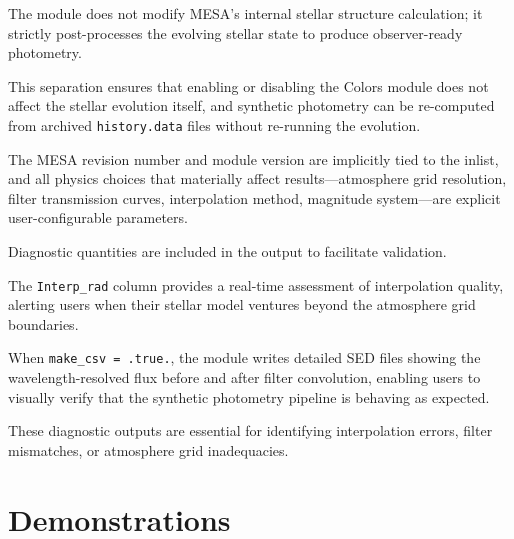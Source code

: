 \documentclass[linenumbers,apj,twocolumn, floatfix]{aastex701} \usepackage{amsmath} \usepackage{longtable} \usepackage{graphicx} \usepackage{ulem} \usepackage{xcolor} \usepackage{lettrine} \usepackage{yfonts} \usepackage{rotating}
\begin{document}
The module does not modify MESA's internal stellar structure calculation; it strictly post-processes the evolving stellar state to produce observer-ready photometry.

This separation ensures that enabling or disabling the Colors module does not affect the stellar evolution itself, and synthetic photometry can be re-computed from archived \texttt{history.data} files without re-running the evolution.

The MESA revision number and module version are implicitly tied to the inlist, and all physics choices that materially affect results—atmosphere grid resolution, filter transmission curves, interpolation method, magnitude system—are explicit user-configurable parameters.

Diagnostic quantities are included in the output to facilitate validation.

The \texttt{Interp\_rad} column provides a real-time assessment of interpolation quality, alerting users when their stellar model ventures beyond the atmosphere grid boundaries.

When \texttt{make\_csv = .true.}, the module writes detailed SED files showing the wavelength-resolved flux before and after filter convolution, enabling users to visually verify that the synthetic photometry pipeline is behaving as expected.

These diagnostic outputs are essential for identifying interpolation errors, filter mismatches, or atmosphere grid inadequacies.

\section{Demonstrations}
\label{sec:demonstrations}
\end{document}
